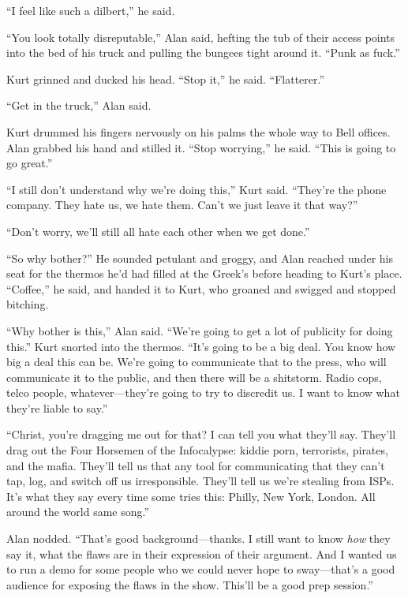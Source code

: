 \documentclass{article}
\begin{document}
``I feel like such a dilbert,'' he said.

``You look totally disreputable,'' Alan said, hefting the tub of their
access points into the bed of his truck and pulling the bungees tight
around it.  ``Punk as fuck.''

Kurt grinned and ducked his head.  ``Stop it,'' he said. 
``Flatterer.''

``Get in the truck,'' Alan said.

Kurt drummed his fingers nervously on his palms the whole way to Bell
offices.  Alan grabbed his hand and stilled it.  ``Stop worrying,'' he
said.  ``This is going to go great.''

``I still don't understand why we're doing this,'' Kurt said. 
``They're the phone company.  They hate us, we hate them.  Can't we
just leave it that way?''

``Don't worry, we'll still all hate each other when we get done.''

``So why bother?'' He sounded petulant and groggy, and Alan reached
under his seat for the thermos he'd had filled at the Greek's before
heading to Kurt's place.  ``Coffee,'' he said, and handed it to Kurt,
who groaned and swigged and stopped bitching.

``Why bother is this,'' Alan said.  ``We're going to get a lot of
publicity for doing this.'' Kurt snorted into the thermos.  ``It's
going to be a big deal.  You know how big a deal this can be.  We're
going to communicate that to the press, who will communicate it to the
public, and then there will be a shitstorm.  Radio cops, telco people,
whatever---they're going to try to discredit us.  I want to know what
they're liable to say.''

``Christ, you're dragging me out for that?  I can tell you what
they'll say.  They'll drag out the Four Horsemen of the Infocalypse: 
kiddie porn, terrorists, pirates, and the mafia.  They'll tell us that
any tool for communicating that they can't tap, log, and switch off us
irresponsible.  They'll tell us we're stealing from ISPs.  It's what
they say every time some tries this:  Philly, New York, London.  All
around the world same song.''

Alan nodded.  ``That's good background---thanks.  I still want to know
\textit{how} they say it, what the flaws are in their expression of
their argument.  And I wanted us to run a demo for some people who we
could never hope to sway---that's a good audience for exposing the
flaws in the show.  This'll be a good prep session.''
\end{document}
